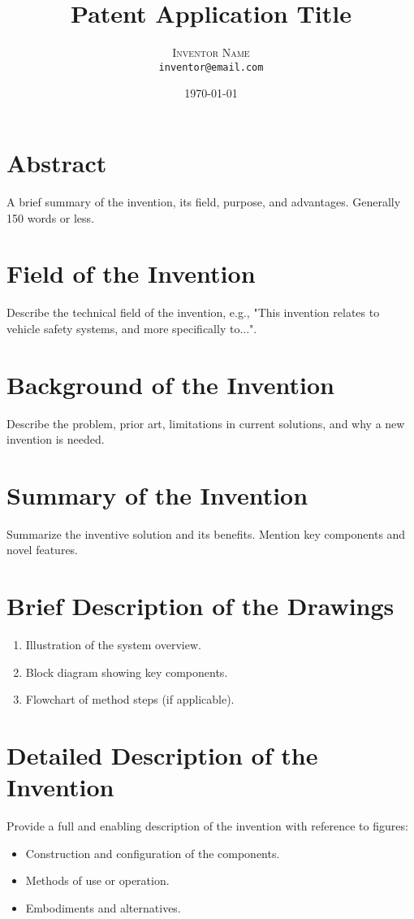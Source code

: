 \documentclass[12pt]{article}
\title{\Huge\bfseries Patent Application Title}
\author{\textsc{Inventor Name} \\ \texttt{inventor@email.com}}
\date{\today}
\begin{document}
\maketitle

\vspace{1em}
\section*{Abstract}
A brief summary of the invention, its field, purpose, and advantages. Generally 150 words or less.

\vspace{1em}
\section*{Field of the Invention}
Describe the technical field of the invention, e.g., "This invention relates to vehicle safety systems, and more specifically to...".

\vspace{1em}
\section*{Background of the Invention}
Describe the problem, prior art, limitations in current solutions, and why a new invention is needed.

\vspace{1em}
\section*{Summary of the Invention}
Summarize the inventive solution and its benefits. Mention key components and novel features.

\vspace{1em}
\section*{Brief Description of the Drawings}
\begin{enumerate}[label=Figure \arabic*:]
    \item Illustration of the system overview.
    \item Block diagram showing key components.
    \item Flowchart of method steps (if applicable).
\end{enumerate}

\vspace{1em}
\section*{Detailed Description of the Invention}
Provide a full and enabling description of the invention with reference to figures:
\begin{itemize}
    \item Construction and configuration of the components.
    \item Methods of use or operation.
    \item Embodiments and alternatives.
\end{itemize}
\end{document}
